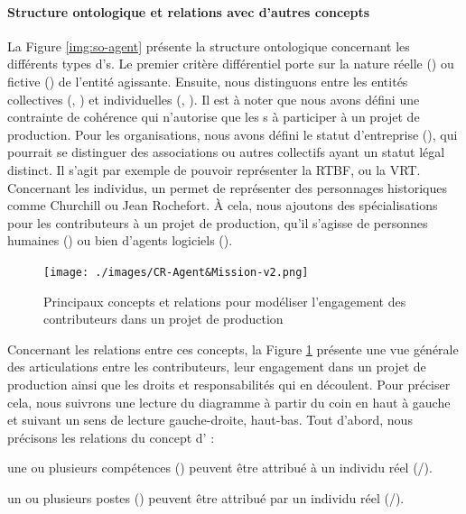 \paragraph{Structure ontologique et relations avec d'autres concepts}
La Figure \ref{img:so-agent} présente la structure ontologique concernant les différents types d's.
Le premier critère différentiel porte sur la nature réelle () ou fictive () de l'entité agissante. 
Ensuite, nous distinguons entre les entités collectives (, ) et individuelles (, ).
Il est à noter que nous avons défini une contrainte de cohérence qui n'autorise que les s à participer à un projet de production.
Pour les organisations, nous avons défini le statut d'entreprise (), qui pourrait se distinguer des associations ou autres collectifs ayant un statut légal distinct. 
Il s'agit par exemple de pouvoir représenter la RTBF, ou la VRT. 
Concernant les individus, un  permet de représenter des personnages historiques comme Churchill ou Jean Rochefort. 
À cela, nous ajoutons des spécialisations pour les contributeurs à un projet de production, qu'il s'agisse de personnes humaines () ou bien d'agents logiciels ().

\begin{figure}[ht!]
\centering
\texttt{[image: ./images/CR-Agent\&Mission-v2.png]}
\caption{Principaux concepts et relations pour modéliser l'engagement des contributeurs dans un projet de production}
\label{img:cr-agent}
\end{figure}

Concernant les relations entre ces concepts, la Figure \ref{img:cr-agent} présente une vue générale des articulations entre les contributeurs, leur engagement dans un projet de production ainsi que les droits et responsabilités qui en découlent.
Pour préciser cela, nous suivrons une lecture du diagramme à partir du coin en haut à gauche et suivant un sens de lecture gauche-droite, haut-bas.
Tout d'abord, nous précisons les relations du concept d' :
\begin{liste}
	\item une ou plusieurs compétences () peuvent être attribué à un individu réel (/).
	\item un ou plusieurs postes () peuvent être attribué par un individu réel (/).
\end{liste}


